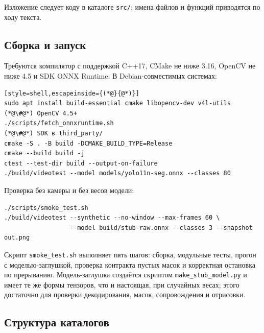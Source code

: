 \documentclass[11pt,a4paper]{article}
\theoremstyle{definition}
\theoremstyle{remark}
\begin{document}
Изложение следует коду в каталоге \texttt{src/}; имена файлов и функций
приводятся по ходу текста.

\subsection{Сборка и запуск}

Требуются компилятор с поддержкой C++17, CMake не ниже 3.16, OpenCV не ниже
4.5 и SDK ONNX Runtime. В Debian-совместимых системах:

\begin{lstlisting}[style=shell,escapeinside={(*@}{@*)}]
sudo apt install build-essential cmake libopencv-dev v4l-utils   (*@\#@*) OpenCV 4.5+
./scripts/fetch_onnxruntime.sh                                   (*@\#@*) SDK в third_party/
cmake -S . -B build -DCMAKE_BUILD_TYPE=Release
cmake --build build -j
ctest --test-dir build --output-on-failure
./build/videotest --model models/yolo11n-seg.onnx --classes 80
\end{lstlisting}

Проверка без камеры и без весов модели:

\begin{lstlisting}[style=shell]
./scripts/smoke_test.sh
./build/videotest --synthetic --no-window --max-frames 60 \
                  --model build/stub-raw.onnx --classes 3 --snapshot out.png
\end{lstlisting}

Скрипт \texttt{smoke\_test.sh} выполняет пять шагов: сборка, модульные тесты,
прогон с моделью-заглушкой, проверка контракта пустых масок и корректная
остановка по прерыванию. Модель-заглушка создаётся скриптом
\texttt{make\_stub\_model.py} и имеет те же формы тензоров, что и настоящая,
при случайных весах; этого достаточно для проверки декодирования, масок,
сопровождения и отрисовки.

\subsection{Структура каталогов}
\end{document}
